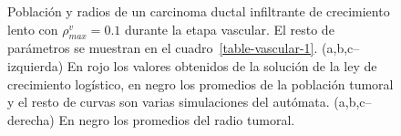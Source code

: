 \begin{figure}[p]
\begin{center}
{}\vspace*{-0.2cm}
\end{center}\vspace*{-0.6cm}
\caption[Poblaci\'on y radios de un carcinoma ductal infiltrante de crecimiento lento con $\rho_{max}^v=0$.$1$ durante la etapa vascular]{Poblaci\'on y radios de un carcinoma ductal infiltrante de crecimiento lento con $\rho_{max}^v=0$.$1$ durante la etapa vascular. El resto de par\'ametros se muestran en el cuadro~\ref{table-vascular-1}. (a,b,c--izquierda) En rojo los valores obtenidos de la soluci\'on de la ley de crecimiento log\'istico, en negro los promedios de la poblaci\'on tumoral y el resto de curvas son varias simulaciones del aut\'omata. (a,b,c--derecha) En negro los promedios del radio tumoral.}
\label{graph-vascular-simulations-1}
\end{figure}

